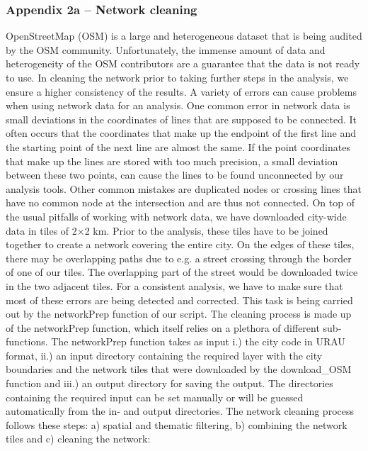 \documentclass[10pt]{article}
\begin{document}
\subsubsection{Appendix 2a – Network cleaning}
OpenStreetMap (OSM) is a large and heterogeneous dataset that is being audited by the OSM community.
Unfortunately, the immense amount of data and heterogeneity of the OSM contributors are a guarantee that the data is not ready to use.
In cleaning the network prior to taking further steps in the analysis, we ensure a higher consistency of the results.
A variety of errors can cause problems when using network data for an analysis. 
One common error in network data is small deviations in the coordinates of lines that are supposed to be connected.
It often occurs that the coordinates that make up the endpoint of the first line and the starting point of the next line are almost the same.
If the point coordinates that make up the lines are stored with too much precision, a small deviation between these two points, can cause the lines to be found unconnected by our analysis tools.
Other common mistakes are duplicated nodes or crossing lines that have no common node at the intersection and are thus not connected.
On top of the usual pitfalls of working with network data, we have downloaded city-wide data in tiles of 2×2 km. 
Prior to the analysis, these tiles have to be joined together to create a network covering the entire city.
On the edges of these tiles, there may be overlapping paths due to e.g. a street crossing through the border of one of our tiles.
The overlapping part of the street would be downloaded twice in the two adjacent tiles.
For a consistent analysis, we have to make sure that most of these errors are being detected and corrected.
This task is being carried out by the networkPrep function of our script.
The cleaning process is made up of the networkPrep function, which itself relies on a plethora of different sub-functions.
The networkPrep function takes as input i.) the city code in URAU format, ii.) an input directory containing the required layer with the city boundaries and the network tiles that were downloaded by the download\_OSM function and iii.) an output directory for saving the output.
The directories containing the required input can be set manually or will be guessed automatically from the in- and output directories.
The network cleaning process follows these steps: a) spatial and thematic filtering, b) combining the network tiles and c) cleaning the network:
\end{document}
